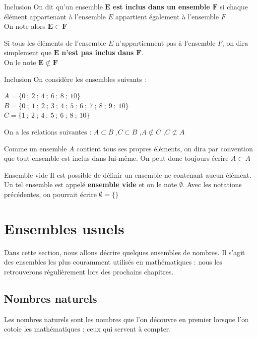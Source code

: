 \documentclass[oneside,12pt]{article}          %
\begin{document}
\begin{definition}{Inclusion}
	On dit qu'un ensemble \textbf{$\mathbold E$ est inclus dans un ensemble $\mathbold F$} si chaque élément appartenant à l'ensemble $E$ appartient également à l'ensemble $F$\\
	On note alors $\mathbold{E\subset F}$ 
	
	Si tous les éléments de l'ensemble $E$ n'appartiennent pas à l'ensemble $F$, on dira simplement que \textbf{$\mathbold E$ n'est pas inclus dans $\mathbold F$}. \\
	On le note $\mathbold{E\not\subset F}$
\end{definition}

\begin{exemple}{Inclusion}
	On considère les ensembles suivants :
	
	$A=\{0~;~2~;~4~;~6~;~8~;~10\}$\\
	$B=\{0~;~1~;~2~;~3~;~4~;~5~;~6~;~7~;~8~;~9~;~10\}$ \\
	$C=\{1~;~2~;~4~;~5~;~6~;~8~;~10\}$

	On a les relations suivantes : $A\subset B$ \quad,\quad $C\subset B$ \quad,\quad $A\not\subset C$ \quad,\quad $C\not\subset A$
\end{exemple}

\begin{remarque}
	Comme un ensemble $A$ contient tous ses propres éléments, on dira par convention que tout ensemble est inclus dans lui-même. On peut donc toujours écrire $A \subset A$
\end{remarque}



\begin{definition}{Ensemble vide}
	Il est possible de définir un ensemble ne contenant aucun élément. Un tel ensemble est appelé \textbf{ensemble vide} et on le note $\emptyset$. Avec les notations précédentes, on pourrait écrire $\emptyset = \{ \}$
\end{definition}



\section{Ensembles usuels}
Dans cette section, nous allons décrire quelques ensembles de nombres. Il s'agit des ensembles les plus couramment utilisés en mathématiques : nous les retrouverons régulièrement lors des prochains chapitres.



\subsection{Nombres naturels}
Les nombres naturels sont les nombres que l'on découvre en premier lorsque l'on cotoie les mathématiques : ceux qui servent à compter.
\end{document}
